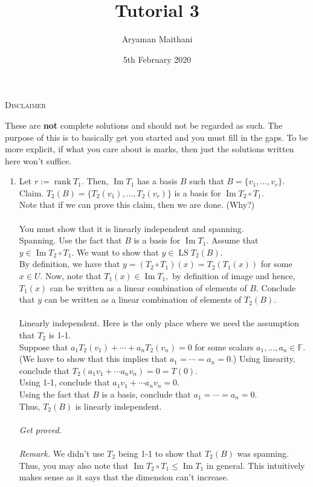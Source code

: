 \documentclass{article}
\title{Tutorial 3}				%
\author{Aryaman Maithani}
\date{5th February 2020}		%
\newcommand{\rank}{\operatorname{rank}}
\renewcommand{\Im}{\operatorname{Im}}
\begin{document}
\maketitle

\hrulefill

\begin{center}
	\textsc{Disclaimer}
\end{center}
These are \textbf{not} complete solutions and should not be regarded as such. The purpose of this is to basically get you started and you must fill in the gaps. To be more explicit, if what you care about is marks, then just the solutions written here won't suffice.

\hrulefill

\begin{enumerate} 
	\itemsep1em
	\item Let $r := \rank T_1.$ Then, $\Im T_1$ has a basis $B$ such that $B = \{v_1, \ldots, v_r\}.$\\
	Claim. $T_2(B) = \{T_2(v_1), \ldots, T_2(v_r)\}$ is a basis for $\Im T_2 \circ T_1.$\\
	Note that if we can prove this claim, then we are done. \hfill (Why?)\\~\\
	You must show that it is linearly independent and spanning. \\
	Spanning. Use the fact that $B$ is a basis for $\Im T_1.$ Assume that $y \in \Im T_2 \circ T_1.$ We want to show that $y \in \operatorname{LS} T_2(B).$\\
	By definition, we have that $y = (T_2 \circ T_1)(x) = T_2(T_1(x))$ for some $x \in U.$ Now, note that $T_1(x) \in \Im T_1,$ by definition of image and hence, $T_1(x)$ can be written as a linear combination of elements of $B.$ Conclude that $y$ can be written as a linear combination of elements of $T_2(B).$\\~\\
	Linearly independent. Here is the only place where we need the assumption that $T_2$ is 1-1.\\
	Suppose that $a_1T_2(v_1) + \cdots + a_nT_2(v_n) = 0$ for some scalars $a_1, \ldots, a_n \in \mathbb{F}.$\\
	(We have to show that this implies that $a_1 = \cdots = a_n = 0.$)
	Using linearity, conclude that $T_2(a_1v_1 + \cdots a_nv_n) = 0 = T(0).$\\
	Using 1-1, conclude that $a_1v_1 + \cdots a_nv_n = 0.$\\
	Using the fact that $B$ is a basis, conclude that $a_1 = \cdots = a_n = 0.$\\
	Thus, $T_2(B)$ is linearly independent.\\~\\
	\emph{Get proved.}\\~\\
	\emph{Remark.} We didn't use $T_2$ being 1-1 to show that $T_2(B)$ was spanning. Thus, you may also note that $\Im T_2 \circ T_1 \le \Im T_1$ in general. This intuitively makes sense as it says that the dimension can't increase.


\end{enumerate}
\end{document}
